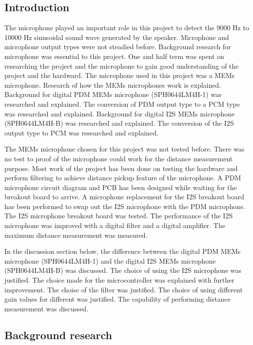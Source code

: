 \subsection{Introduction}
The microphone played an important role in this project to detect the 9000 Hz to 10000 Hz sinusoidal sound wave generated by the speaker. Microphone and microphone output types were not steadied before. Background research for microphone was essential to this project. One and half term was spent on researching the project and the microphone to gain good understanding of the project and the hardward. The microphone used in this project was a MEMs microphone. Research of how the MEMs microphones work is explained. Background for digital PDM MEMs microphone (SPH0644LM4H-1) was researched and explained. The conversion of PDM output type to a PCM type was researched and explained. Background for digital I2S MEMs microphone (SPH0644LM4H-B) was researched and explained. The conversion of the I2S output type to PCM was researched and explained. 

The MEMs microphone chosen for this project was not tested before. There was no test to proof of the microphone could work for the distance measurement purpose. Most work of the project has been done on testing the hardware and perform filtering to achieve distance pickup feature of the microphone. A PDM microphone circuit diagram and PCB has been designed while waiting for the breakout board to arrive. A microphone replacement for the I2S breakout board has been performed to swap out the I2S microphone with the PDM microphone. The I2S microphone breakout board was tested. The performance of the I2S microphone was improved with a digital filter and a digital amplifier. The maximum distance measurement was measured. 

In the discussion section below, the difference between the digital PDM MEMs microphone (SPH0644LM4H-1) and the digital I2S MEMs microphone (SPH0644LM4H-B) was discussed. The choice of using the I2S microphone was justified. The choice made for the microcontroller was explained with further improvement. The choise of the filter was justified. The choice of using different gain values for different was justified. The capability of performing distance measurement was discussed.

\subsection{Background research}
